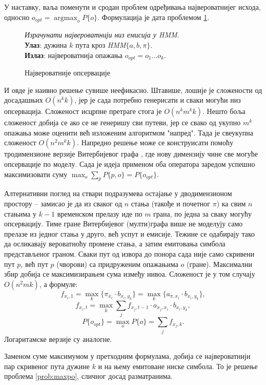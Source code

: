\documentclass[12pt,oneside]{memoir}
\newenvironment{problem}[1][!ht]
{\renewcommand{\algorithmcfname}{Проблем}
\begin{figure}[!ht]
\centering
  \begin{minipage}{.94\linewidth}
	\begin{algorithm}[#1]%
  }{\end{algorithm}
  \end{minipage}
\end{figure}}
\begin{document}
\begin{CJK}{UTF8}{ipxm}
У наставку, ваља поменути и сродан проблем одређивања највероватнијег исхода, односно $o_{opt} = \operatorname{argmax}_o P\{o\}$. Формулација је дата проблемом \ref{prob:maxops}.

\begin{problem}[H]
  \SetAlgoLined
  \textit{Израчунати највероватнији низ емисија у \textit{HMM}.}\\
  \textbf{Улаз}: дужина $k$ пута кроз \textit{HMM}$\{a, b, \pi\}$.\\
  \textbf{Излаз}: највероватнија опажања $o_{opt} = o_1...o_k$.
  \caption{Највероватније опсервације}
  \label{prob:maxops}
\end{problem}

И овде је наивно решење сувише неефикасно. Штавише, лошије је сложености од досадашњих $O(n^k k)$, јер је сада потребно генерисати и сваки могући низ опсервација. Сложеност исцрпне претраге стога је $O(n^k m^k k)$. Нешто боља сложеност добија се ако се не генеришу сви путеви, јер се свако од укупно $m^k$ опажања може оценити већ изложеним алгоритмом "напред". Тада је свеукупна сложеност $O(n^2 m^k k)$. Напредно решење може се конструисати помоћу тродимензионе верзије Витербијевог графа \cite{compeau2015}, где нову димензију чине све могуће опсервације по моделу. Сада је идеја применом оба оператора заредом успешно максимизовати суму $\max_o \sum_p P\{p, o\} = P\{o_{opt}\}$.

Алтернативни поглед на ствари подразумева остајање у дводимензионом простору -- замисао је да из сваког од $n$ стања (такође и почетног $\pi$) ка свим $n$ стањима у $k-1$ временском прелазу иде по $m$ грана, по једна за сваку могућу опсервацију. Тиме гране Витербијевог (мулти)графа више не моделују само прелазе из једног стања у друго, већ успут и емисије. Тежине се одабирају тако да осликавају вероватноћу промене стања, а затим емитовања симбола представљеног граном. Сваки пут од извора до понора сада није само скривени пут $p$, већ пут $p$ (чворови) са придруженим опажањима $o$ (гране). Максимални збир добија се максимизирањем сума између нивоа. Сложеност је у том случају $O(n^2 m k)$, а формуле: $$f_{x_i, 1} = \max_k \{\pi_{x_i} \cdot b_{x_i, y_k}\} = \max_k \{a_{\pi, x_i} \cdot b_{x_i, y_k}\},$$ $$f_{x_i, t} = \max_k \sum_j f_{x_j, t-1} \cdot a_{x_j, x_i} \cdot b_{x_i, y_k},$$ $$P\{o_{opt}\} = \max_o P\{o\} = \sum_j f_{x_j, k}.$$ Логаритамске верзије су аналогне.

Заменом суме максимумом у претходним формулама, добија се највероватнији пар скривеног пута дужине $k$ и на њему емитоване ниске симбола. То је решење проблема \ref{prob:maxpo}, сличног досад разматранима.


\end{CJK}
\end{document}
